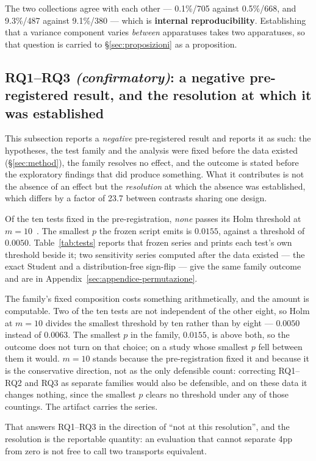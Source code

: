 The two collections agree with each other --- 0.1\%/705 against 0.5\%/668, and 9.3\%/487 against 9.1\%/380
--- which is \textbf{internal reproducibility}. Establishing that a variance component varies \emph{between}
apparatuses takes two apparatuses, so that question is carried to \S\ref{sec:proposizioni} as a
proposition.

\subsection{RQ1--RQ3 \emph{(confirmatory)}: a negative pre-registered result, and the resolution at
which it was established}

This subsection reports a \emph{negative} pre-registered result and reports it as such: the hypotheses,
the test family and the analysis were fixed before the data existed (\S\ref{sec:method}), the family
resolves no effect, and the outcome is stated before the exploratory findings that did produce something.
What it contributes is not the absence of an effect but the \emph{resolution} at which the absence was
established, which differs by a factor of 23.7 between contrasts sharing one design.

Of the ten tests fixed in the pre-registration, \emph{none} passes its Holm threshold at
$m=10$~\citep{holm1979}. The smallest $p$ the frozen script emits is $0.0155$, against a threshold of
$0.0050$. Table~\ref{tab:tests} reports that frozen series and prints each test's own threshold beside it;
two sensitivity series computed after the data existed --- the exact Student and a distribution-free
sign-flip --- give the same family outcome and are in
Appendix~\ref{sec:appendice-permutazione}.

The family's fixed composition costs something arithmetically, and the amount is computable. Two of the
ten tests are not independent of the other eight, so Holm at $m=10$ divides the smallest threshold by ten
rather than by eight --- $0.0050$ instead of $0.0063$. The smallest $p$ in the family, $0.0155$, is above
both, so the outcome does not turn on that choice; on a study whose smallest $p$ fell between them it
would. $m=10$ stands because the pre-registration fixed it and because it is the conservative direction, not as
the only defensible count: correcting RQ1--RQ2 and RQ3 as separate families would also be defensible, and
on these data it changes nothing, since the smallest $p$ clears no threshold under any of those countings.
The artifact carries the series.

That answers RQ1--RQ3 in the direction of ``not at this resolution'', and the resolution is the
reportable quantity: an evaluation that cannot separate 4pp from zero is not free to call two transports
equivalent.

